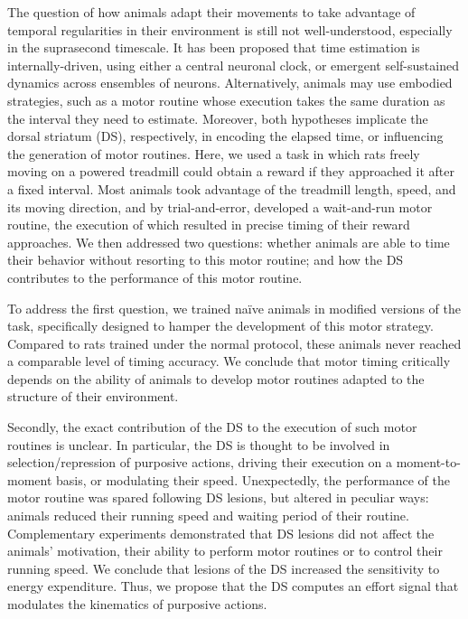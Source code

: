 The question of how animals adapt their movements to take advantage of temporal regularities in their environment is still not well-understood, especially in the suprasecond timescale.
It has been proposed that time estimation is internally-driven, using either a central neuronal clock, or emergent self-sustained dynamics across ensembles of neurons.
Alternatively, animals may use embodied strategies, such as a motor routine whose execution takes the same duration as the interval they need to estimate.
Moreover, both hypotheses implicate the dorsal striatum (DS), respectively, in encoding the elapsed time, or influencing the generation of motor routines.
Here, we used a task in which rats freely moving on a powered treadmill could obtain a reward if they approached it after a fixed interval.
Most animals took advantage of the treadmill length, speed, and its moving direction, and by trial-and-error, developed a wait-and-run motor routine, the execution of which resulted in precise timing of their reward approaches.
We then addressed two questions:
    whether animals are able to time their behavior without resorting to this motor routine;
    and how the DS contributes to the performance of this motor routine.

\par

To address the first question, we trained na\"ive animals in modified versions of the task, specifically designed to hamper the development of this motor strategy.
Compared to rats trained under the normal protocol, these animals never reached a comparable level of timing accuracy.
We conclude that motor timing critically depends on the ability of animals to develop motor routines adapted to the structure of their environment.

\par

Secondly, the exact contribution of the DS to the execution of such motor routines is unclear.
In particular, the DS is thought to be involved in selection/repression of purposive actions, driving their execution on a moment-to-moment basis, or modulating their speed. 
Unexpectedly, the performance of the motor routine was spared following DS lesions, but altered in peculiar ways:
    animals reduced their running speed and waiting period of their routine.
Complementary experiments demonstrated that DS lesions did not affect the animals' motivation, their ability to perform motor routines or to control their running speed.
We conclude that lesions of the DS increased the sensitivity to energy expenditure.
Thus, we propose that the DS computes an effort signal that modulates the kinematics of purposive actions.